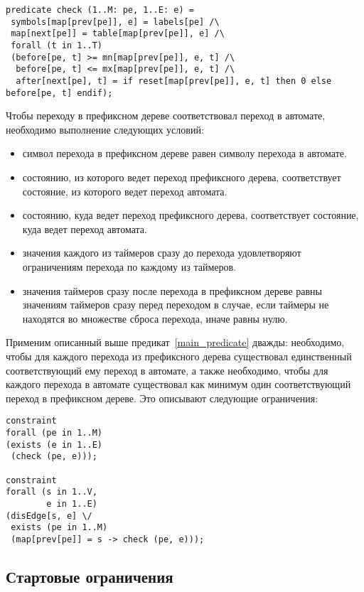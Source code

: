 \documentclass[times,specification,annotation]{itmo-student-thesis}
\begin{document}
\begin{lstlisting}[float=!h,language=Mzn,caption={Основной предикат на переходы},label={main_predicate}]
predicate check (1..M: pe, 1..E: e) =
 symbols[map[prev[pe]], e] = labels[pe] /\
 map[next[pe]] = table[map[prev[pe]], e] /\
 forall (t in 1..T)
 (before[pe, t] >= mn[map[prev[pe]], e, t] /\
  before[pe, t] <= mx[map[prev[pe]], e, t] /\
  after[next[pe], t] = if reset[map[prev[pe]], e, t] then 0 else before[pe, t] endif);
\end{lstlisting}

Чтобы переходу в префиксном дереве соответствовал переход в автомате, необходимо выполнение следующих условий:

\begin{itemize}
  \item символ перехода в префиксном дереве равен символу перехода в автомате.
  \item состоянию, из которого ведет переход префиксного дерева, соответствует состояние, из которого ведет переход автомата.
  \item состоянию, куда ведет переход префиксного дерева, соответствует состояние, куда ведет переход автомата.
  \item значения каждого из таймеров сразу до перехода удовлетворяют ограничениям перехода по каждому из таймеров.
  \item значения таймеров сразу после перехода в префиксном дереве равны значениям таймеров сразу перед переходом в случае,
    если таймеры не находятся во множестве сброса перехода, иначе равны нулю.
\end{itemize}

Применим описанный выше предикат~\ref{main_predicate} дважды: необходимо, чтобы для каждого перехода из префиксного дерева существовал единственный
соответствующий ему переход в автомате, а также необходимо, чтобы для каждого перехода в автомате существовал как минимум один соответствующий
переход в префиксном дереве. Это описывают следующие ограничения:

\begin{lstlisting}[float=!h,language=Mzn,caption={Использование основного предиката},label={main_constraints}]
constraint
forall (pe in 1..M)
(exists (e in 1..E)
 (check (pe, e)));

constraint
forall (s in 1..V,
        e in 1..E)
(disEdge[s, e] \/
 exists (pe in 1..M)
 (map[prev[pe]] = s -> check (pe, e)));
\end{lstlisting}

\subsection{Стартовые ограничения}
\end{document}
